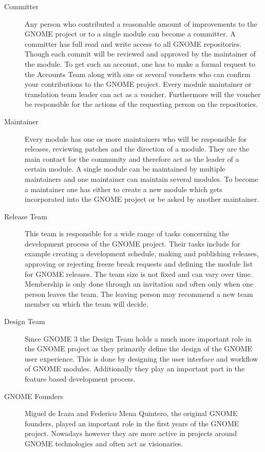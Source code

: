 \begin{description}

  \item[Committer] Any person who contributed a reasonable amount of
    improvements to the GNOME project or to a single module can become a
    committer. A committer has full read and write access to all GNOME
    repositories. Though each commit will be reviewed and approved by the
    maintainer of the module. To get such an account, one has to make a formal
    request to the Accounts Team along with one or several vouchers who can
    confirm your contributions to the GNOME project. Every module maintainer or
    translation team leader can act as a voucher. Furthermore will the voucher
    be responsible for the actions of the requesting person on the
    repositories.

  \item[Maintainer] Every module has one or more maintainers who will be
    responsible for releases, reviewing patches and the direction of a module.
    They are the main contact for the community and therefore act as the leader
    of a certain module. A single module can be maintained by multiple
    maintainers and one maintainer can maintain several modules. To become a
    maintainer one has either to create a new module which gets incorporated
    into the GNOME project or be asked by another maintainer.

  \item[Release Team] This team is responsible for a wide range of tasks
    concerning the development process of the GNOME project. Their tasks
    include for example creating a development schedule, making and publishing
    releases, approving or rejecting freeze break requests and defining the
    module list for GNOME releases. The team size is not fixed and can vary
    over time. Membership is only done through an invitation and often only
    when one person leaves the team. The leaving person may recommend a new
    team member on which the team will decide.

  \item[Design Team] Since GNOME 3 the Design Team holds a much more important
    role in the GNOME project as they primarily define the design of the GNOME
    user experience. This is done by designing the user interface and workflow
    of GNOME modules. Additionally they play an important part in the feature
    based development process.

  \item[GNOME Founders] Miguel de Icaza and Federico Mena Quintero, the
    original GNOME founders, played an important role in the first years of the
    GNOME project. Nowadays however they are more active in projects around
    GNOME technologies and often act as visionaries.

\end{description}

